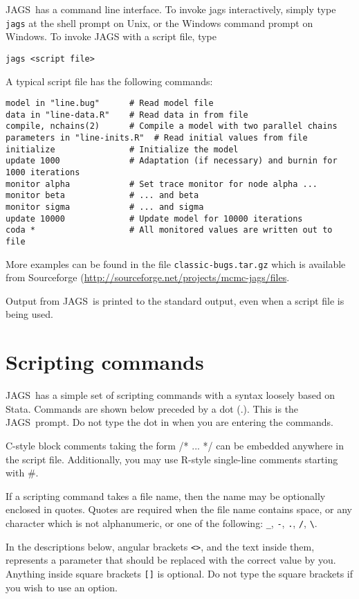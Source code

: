 \documentclass[11pt, a4paper, titlepage]{report}
\newcommand{\JAGS}{\textsf{JAGS}}
\newcommand{\R}{\textsf{R}}
\begin{document}
\JAGS\ has a command line interface. To invoke jags interactively,
simply type \texttt{jags} at the shell prompt on Unix, or the Windows
command prompt on Windows. To invoke JAGS with a script file, type
\begin{verbatim}
jags <script file>
\end{verbatim}
A typical script file has the following commands: 
\begin{verbatim}
model in "line.bug"      # Read model file
data in "line-data.R"    # Read data in from file
compile, nchains(2)      # Compile a model with two parallel chains
parameters in "line-inits.R"  # Read initial values from file
initialize               # Initialize the model
update 1000              # Adaptation (if necessary) and burnin for 1000 iterations
monitor alpha            # Set trace monitor for node alpha ...
monitor beta             # ... and beta
monitor sigma            # ... and sigma
update 10000             # Update model for 10000 iterations
coda *                   # All monitored values are written out to file
\end{verbatim}
More examples can be found in the file \verb+classic-bugs.tar.gz+
which is available from Sourceforge
(\url{http://sourceforge.net/projects/mcmc-jags/files}.

Output from \JAGS\ is printed to the standard output, even when a
script file is being used.  

\section{Scripting commands}
\label{section:scripting}

\JAGS\ has a simple set of scripting commands with a syntax loosely
based on \textsf{Stata}. Commands are shown below preceded by a dot
(.). This is the \JAGS\ prompt. Do not type the dot in when you are
entering the commands.

C-style block comments taking the form /* ... */ can be
embedded anywhere in the script file.  Additionally, you may use
\R-style single-line comments starting with \#.

If a scripting command takes a file name, then the name may be
optionally enclosed in quotes. Quotes are required when the file name
contains space, or any character which is not alphanumeric, or one of
the following: \verb+_+, \verb+-+, \verb+.+, \verb+/+, \verb+\+.

In the descriptions below, angular brackets \verb+<>+, and the text
inside them, represents a parameter that should be replaced with the
correct value by you.  Anything inside square brackets \verb+[]+ is
optional. Do not type the square brackets if you wish to use an
option.
\end{document}
